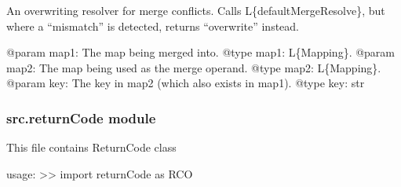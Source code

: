 \documentclass[a4paper,10pt,english]{sphinxmanual}
\begin{document}

\begin{fulllineitems}
\label{\detokenize{apidoc_src/src:src.pyconf.overwriteMergeResolve}}
An overwriting resolver for merge conflicts. Calls L\{defaultMergeResolve\},
but where a “mismatch” is detected, returns “overwrite” instead.

@param map1: The map being merged into.
@type map1: L\{Mapping\}.
@param map2: The map being used as the merge operand.
@type map2: L\{Mapping\}.
@param key: The key in map2 (which also exists in map1).
@type key: str

\end{fulllineitems}



\subsubsection{src.returnCode module}
\label{\detokenize{apidoc_src/src:module-src.returnCode}}\label{\detokenize{apidoc_src/src:src-returncode-module}}
This file contains ReturnCode class

usage:
\textgreater{}\textgreater{} import returnCode as RCO
\end{document}
